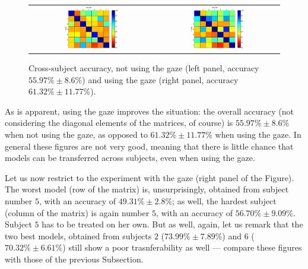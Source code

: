 \documentclass[jou,a4paper,notxfonts]{apa}
\begin{document}
\begin{figure}[!ht]
  \centering
    \begin{tabular}{cc}
      \includegraphics[width=0.45\textwidth]{figs/cross_nogaze.eps} &
      \includegraphics[width=0.45\textwidth]{figs/cross_gaze.eps} \\
    \end{tabular}
    \caption{Cross-subject accuracy, not using the gaze (left panel,
    accuracy $55.97\% \pm 8.6\%$) and using the gaze (right panel,
    accuracy $61.32\% \pm 11.77\%$).}
    \label{fig:cross}
\end{figure}

As is apparent, using the gaze improves the situation: the overall
accuracy (not considering the diagonal elements of the matrices, of
course) is $55.97\% \pm 8.6\%$ when not using the gaze, as opposed to
$61.32\% \pm 11.77\%$ when using the gaze. In general these figures
are not very good, meaning that there is little chance that models can
be transferred across subjects, even when using the gaze.

Let us now restrict to the experiment with the gaze (right panel of the
Figure). The worst model (row of the matrix) is, unsurprisingly,
obtained from subject number $5$, with an accuracy of $49.31\% \pm
2.8\%$; as well, the hardest subject (column of the matrix) is again
number $5$, with an accuracy of $56.70\% \pm 9.09\%$. Subject $5$ has
to be treated on her own. But as well, again, let us remark that the
two best models, obtained from subjects $2$ ($73.99\% \pm 7.89\%$) and
$6$ ($70.32\% \pm 6.61\%$) still show a poor trasnferability as well
--- compare these figures with those of the previous Subsection.
\end{document}
